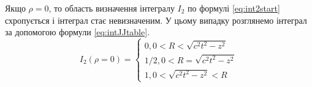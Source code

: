 Якщо $ \rho = 0 $, то область визначення інтегралу $ I_2 $ по формулі 
\eqref{eq:int2start} схропується і інтеграл стає невизначеним. У цьому випадку 
розглянемо інтеграл за допомогою формули \eqref{eq:intJJtable}.
%
%
\begin{equation}
I_2 \left( \rho = 0 \right) = \begin{cases}
0, 0 < R < \sqrt{c^2t^2 - z^2} \\
1/2, 0 < R = \sqrt{c^2t^2 - z^2} \\ 
1, 0 < \sqrt{c^2t^2 - z^2} < R 
\end{cases}
\end{equation}
